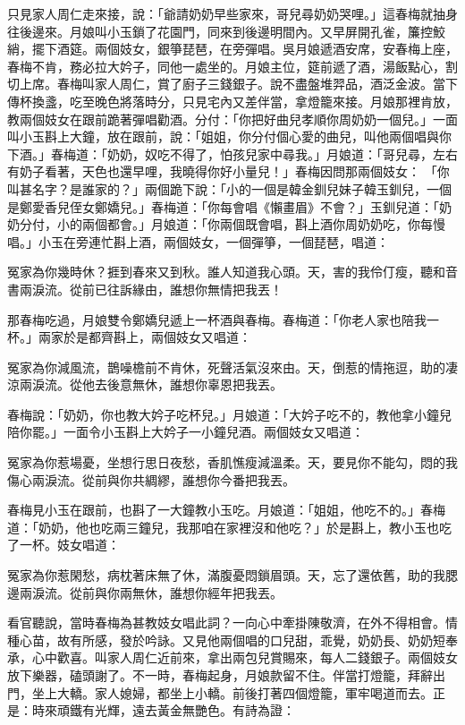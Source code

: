 \begin{showcontents}{}
只見家人周仁走來接，說：「爺請奶奶早些家來，哥兒尋奶奶哭哩。」這春梅就抽身往後邊來。月娘叫小玉鎖了花園門，同來到後邊明間內。又早屏開孔雀，簾控鮫綃，擺下酒筵。兩個妓女，銀箏琵琶，在旁彈唱。吳月娘遞酒安席，安春梅上座，春梅不肯，務必拉大妗子，同他一處坐的。月娘主位，筵前遞了酒，湯飯點心，割切上席。春梅叫家人周仁，賞了廚子三錢銀子。說不盡盤堆羿品，酒泛金波。當下傳杯換盞，吃至晚色將落時分，只見宅內又差伴當，拿燈籠來接。月娘那裡肯放，教兩個妓女在跟前跪著彈唱勸酒。分付：「你把好曲兒孝順你周奶奶一個兒。」一面叫小玉斟上大鐘，放在跟前，說：「姐姐，你分付個心愛的曲兒，叫他兩個唱與你下酒。」春梅道：「奶奶，奴吃不得了，怕孩兒家中尋我。」月娘道：「哥兒尋，左右有奶子看著，天色也還早哩，我曉得你好小量兒！」春梅因問那兩個妓女： 「你叫甚名字？是誰家的？」兩個跪下說：「小的一個是韓金釧兒妹子韓玉釧兒，一個是鄭愛香兒侄女鄭嬌兒。」春梅道：「你每會唱《懶畫眉》不會？」玉釧兒道：「奶奶分付，小的兩個都會。」月娘道：「你兩個既會唱，斟上酒你周奶奶吃，你每慢唱。」小玉在旁連忙斟上酒，兩個妓女，一個彈箏，一個琵琶，唱道：

冤家為你幾時休？捱到春來又到秋。誰人知道我心頭。天，害的我伶仃瘦，聽和音書兩淚流。從前已往訴緣由，誰想你無情把我丟！

那春梅吃過，月娘雙令鄭嬌兒遞上一杯酒與春梅。春梅道：「你老人家也陪我一杯。」兩家於是都齊斟上，兩個妓女又唱道：

冤家為你減風流，鵲噪檐前不肯休，死聲活氣沒來由。天，倒惹的情拖逗，助的凄涼兩淚流。從他去後意無休，誰想你辜恩把我丟。

春梅說：「奶奶，你也教大妗子吃杯兒。」月娘道：「大妗子吃不的，教他拿小鐘兒陪你罷。」一面令小玉斟上大妗子一小鐘兒酒。兩個妓女又唱道：

冤家為你惹場憂，坐想行思日夜愁，香肌憔瘦減溫柔。天，要見你不能勾，悶的我傷心兩淚流。從前與你共綢繆，誰想你今番把我丟。

春梅見小玉在跟前，也斟了一大鐘教小玉吃。月娘道：「姐姐，他吃不的。」春梅道：「奶奶，他也吃兩三鐘兒，我那咱在家裡沒和他吃？」於是斟上，教小玉也吃了一杯。妓女唱道：

冤家為你惹閑愁，病枕著床無了休，滿腹憂悶鎖眉頭。天，忘了還依舊，助的我腮邊兩淚流。從前與你兩無休，誰想你經年把我丟。

看官聽說，當時春梅為甚教妓女唱此詞？一向心中牽掛陳敬濟，在外不得相會。情種心苗，故有所感，發於吟詠。又見他兩個唱的口兒甜，乖覺，奶奶長、奶奶短奉承，心中歡喜。叫家人周仁近前來，拿出兩包兒賞賜來，每人二錢銀子。兩個妓女放下樂器，磕頭謝了。不一時，春梅起身，月娘款留不住。伴當打燈籠，拜辭出門，坐上大轎。家人媳婦，都坐上小轎。前後打著四個燈籠，軍牢喝道而去。正是：時來頑鐵有光輝，遠去黃金無艷色。有詩為證：


\end{showcontents}
